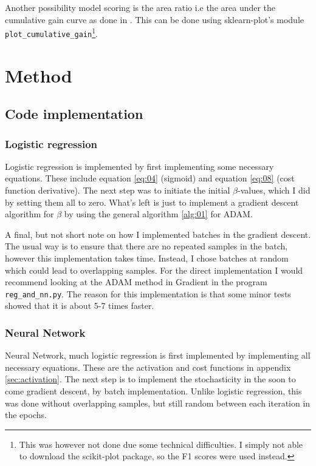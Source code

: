\documentclass[uio,jmp,amsmath,amssymb,reprint,nofootinbib]{revtex4-1}
\numberwithin{equation}{section}
\begin{document}
Another possibility model scoring is the area ratio i.e the area under the cumulative gain curve as done in \cite{yeh2009comparisons}. This can be done using sklearn-plot's module \texttt{plot\_cumulative\_gain}\footnote{This was however not done due some technical difficulties. I simply not able to download the scikit-plot package, so the F1 scores were used instead.}.

\section{Method}\label{sec:Method}

\subsection{Code implementation}

\subsubsection{Logistic regression}

Logistic regression is implemented by first implementing some necessary equations. These include equation \ref{eq:04} (sigmoid) and equation \ref{eq:08} (cost function derivative). The next step was to initiate the initial \(\beta\)-values, which I did by setting them all to zero. What's left is just to implement a gradient descent algorithm for \(\beta\) by using the general algorithm \ref{alg:01} for ADAM. 

A final, but not short note on how I implemented batches in the gradient descent. The usual way is to ensure that there are no repeated samples in the batch, however this implementation takes time. Instead, I chose batches at random which could lead to overlapping samples. For the direct implementation I would recommend looking at the ADAM method in Gradient in the program \texttt{reg\_and\_nn.py}. The reason for this implementation is that some minor tests showed that it is about 5-7 times faster.

\subsubsection{Neural Network}

Neural Network, much logistic regression is first implemented by implementing all necessary equations. These are the activation and cost functions in appendix \ref{sec:activation}. The next step is to implement the stochasticity in the soon to come gradient descent, by batch implementation. Unlike logistic regression, this was done without overlapping samples, but still random between each iteration in the epochs.
\end{document}
